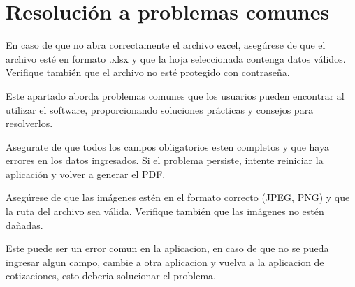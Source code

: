 \documentclass{Pretexto/bluereport}
\begin{document}
\section{Resolución a problemas comunes}
\begin{definicion}
    En caso de que no abra correctamente el archivo excel, asegúrese de que el archivo esté en formato .xlsx y que la hoja seleccionada contenga datos válidos. Verifique también que el archivo no esté protegido con contraseña.
\end{definicion}
\vspace{0.7cm}
\begin{definicion}
    Este apartado aborda problemas comunes que los usuarios pueden encontrar al utilizar el software, 
    proporcionando soluciones prácticas y consejos para resolverlos.
\end{definicion}
\vspace{0.7cm}
\begin{definicion}
    Asegurate de que todos los campos obligatorios esten completos y que haya errores en los datos ingresados. Si el problema persiste, intente reiniciar la aplicación y volver a generar el PDF.

\end{definicion}
\vspace{0.7cm}
\begin{definicion}
    
Asegúrese de que las imágenes estén en el formato correcto (JPEG, PNG) y que la ruta del archivo sea válida. Verifique también que las imágenes no estén dañadas.
\end{definicion}
\vspace{0.7cm}
\begin{definicion}
    Este puede ser un error comun en la aplicacion, en caso de que no se pueda ingresar algun campo, cambie a otra aplicacion y vuelva a la aplicacion de cotizaciones, esto deberia solucionar el problema.
\end{definicion}
\end{document}
